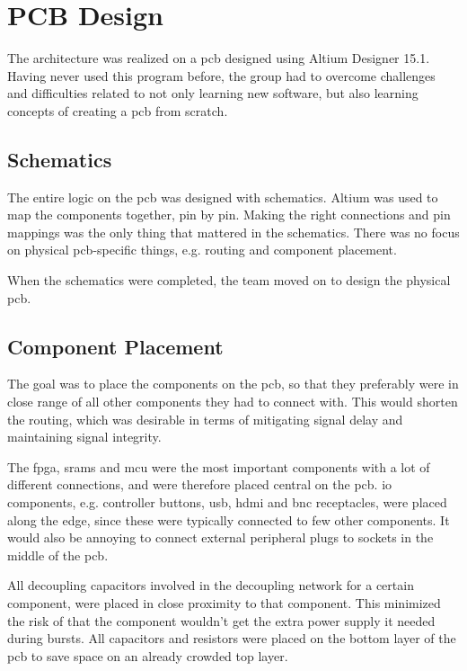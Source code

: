 \section{PCB Design}
The architecture was realized on a \gls{pcb} designed using Altium Designer 15.1.
Having never used this program before, the group had to overcome challenges and difficulties related to not only learning new software, but also learning concepts of creating a \gls{pcb} from scratch.

\subsection{Schematics}
The entire logic on the \gls{pcb} was designed with schematics.
Altium was used to map the components together, pin by pin.
Making the right connections and pin mappings was the only thing that mattered in the schematics.
There was no focus on physical \gls{pcb}-specific things, e.g. routing and component placement.

When the schematics were completed, the team moved on to design the physical \gls{pcb}.

\subsection{Component Placement}
The goal was to place the components on the \gls{pcb}, so that they preferably were in close range of all other components they had to connect with.
This would shorten the routing, which was desirable in terms of mitigating signal delay and maintaining signal integrity.

The \gls{fpga}, \gls{sram}s and \gls{mcu} were the most important components with a lot of different connections, and were therefore placed central on the \gls{pcb}.
\gls{io} components, e.g. controller buttons, \gls{usb}, \gls{hdmi} and \gls{bnc} receptacles, were placed along the edge, since these were typically connected to few other components.
It would also be annoying to connect external peripheral plugs to sockets in the middle of the \gls{pcb}.

All decoupling capacitors involved in the decoupling network for a certain component, were placed in close proximity to that component.
This minimized the risk of that the component wouldn't get the extra power supply it needed during bursts.
All capacitors and resistors were placed on the bottom layer of the \gls{pcb} to save space on an already crowded top layer.

